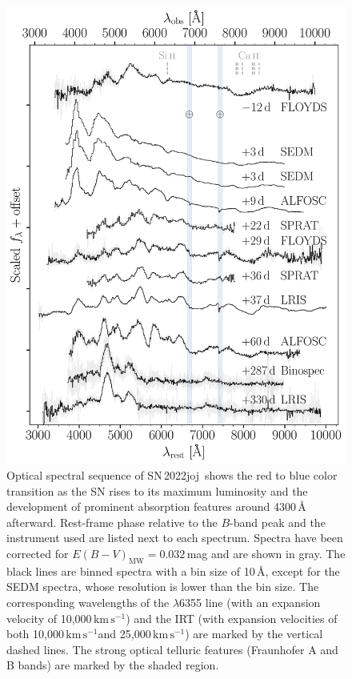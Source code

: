 \documentclass[twocolumn]{aastex631}
\newcommand{\sn}{SN\,2022joj}
\newcommand{\kms}{$\mathrm{km}\,\mathrm{s}^{-1}$}
\begin{document}
\begin{CJK*}{UTF8}{gbsn}
\begin{figure}
    \centering
    \includegraphics[width=\linewidth]{SN2022joj_spectral_sequence.pdf}
    \caption{Optical spectral sequence of \sn\ shows the red to blue color transition as the SN rises to its maximum luminosity and the development of prominent absorption features around 4300\,\r{A} afterward.
    Rest-frame phase relative to the $B$-band peak and the instrument used are listed next to each spectrum. Spectra have been corrected for ${E(B-V)_\mathrm{MW}} = 0.032$\,mag and are shown in gray. The black lines are binned spectra with a bin size of 10\,\AA, except for the SEDM spectra, whose resolution is lower than the bin size. The corresponding wavelengths of the  $\lambda$6355 line (with an expansion velocity of 10,000\,\kms) and the  IRT (with expansion velocities of both 10,000\,\kms and 25,000\,\kms) are marked by the vertical dashed lines. The strong optical telluric features (Fraunhofer A and B bands) are marked by the shaded region.}

\end{figure}
\end{CJK*}
\end{document}
